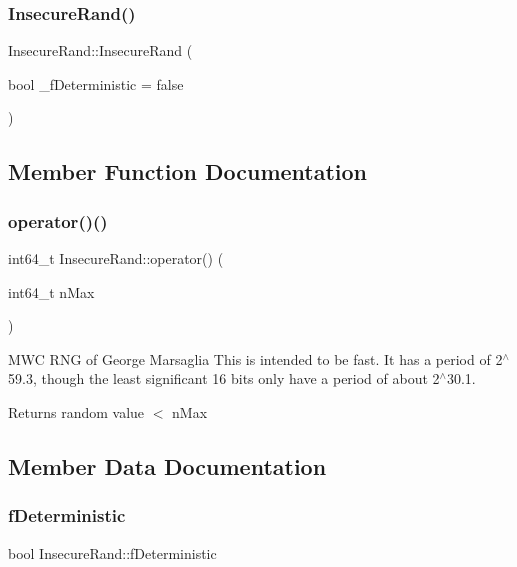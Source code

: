 \subsubsection{\texorpdfstring{Insecure\+Rand()}{InsecureRand()}}
{\footnotesize\ttfamily Insecure\+Rand\+::\+Insecure\+Rand (\begin{DoxyParamCaption}\item[{bool}]{\+\_\+f\+Deterministic = {\ttfamily false} }\end{DoxyParamCaption})}



\subsection{Member Function Documentation}
\mbox{\label{class_insecure_rand_a7d48179092a3acc9e912ad6b53dbd294}} 
\subsubsection{\texorpdfstring{operator()()}{operator()()}}
{\footnotesize\ttfamily int64\+\_\+t Insecure\+Rand\+::operator() (\begin{DoxyParamCaption}\item[{int64\+\_\+t}]{n\+Max }\end{DoxyParamCaption})\hspace{0.3cm}{\ttfamily [inline]}}

M\+WC R\+NG of George Marsaglia This is intended to be fast. It has a period of 2$^\wedge$59.3, though the least significant 16 bits only have a period of about 2$^\wedge$30.1.

\begin{DoxyReturn}{Returns}
random value $<$ n\+Max 
\end{DoxyReturn}


\subsection{Member Data Documentation}
\mbox{\label{class_insecure_rand_ae9bed2d175ff061e26e5596e30305011}} 
\subsubsection{\texorpdfstring{f\+Deterministic}{fDeterministic}}
{\footnotesize\ttfamily bool Insecure\+Rand\+::f\+Deterministic\hspace{0.3cm}{\ttfamily [private]}}

